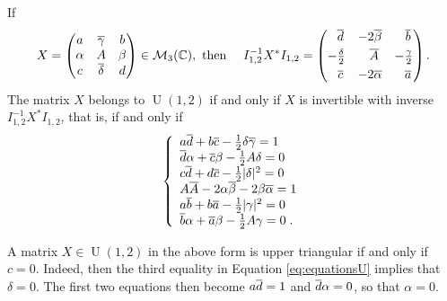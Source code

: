 \documentclass[11pt]{article}
\begin{document}
If
$$
X=\begin{pmatrix} a & \ov{\ga} & b\\
    \alpha & A & \beta \\ c & \ov{\delta} & d\end{pmatrix}\in\M_3(\CC),
\textrm{ then }\quad
I_{1,2}^{-1}X^*I_{1,2}=\begin{pmatrix} \ \ \ov{d} & -2\ov\beta & 
\ \ \ov{b} \vspace{.1cm}\\ 
-\frac{\delta}{2} & \ \ \ov{A} & -\frac{\ga}{2} \vspace{.1cm}\\ 
\ \ \ov{c} & -2\ov{\alpha} & \ \ \ov{a}\end{pmatrix}.
$$
The matrix $X$ belongs to $\operatorname{U}(1,2)$ if and only if $X$ is
invertible with inverse $I_{1,2}^{-1}X^*I_{1,2}$, that is, if and only if
\begin{equation}\label{eq:equationsU}
\left\{\begin{array}{l}
a{\overline{d}}+b\overline{c}-\frac{1}{2}\delta{\overline{\gamma}} =1\\
{\overline{d}}\alpha+\overline{c}\beta-\frac{1}{2}A\delta =0\\
c{\overline{d}}+d{\overline{c}}-\frac{1}{2}|\delta|^2 = 0 \\ 
A {\overline{A}}-2\alpha{\overline{\beta}}- 2\beta{\overline{\alpha}} =1 \\
a{\overline{b}}+b\overline{a}-\frac{1}{2}|\gamma|^2 = 0 \\ 
{\overline{b}}\alpha+{\overline{a}}\beta-\frac{1}{2}A\gamma =0 \;.
\end{array}\right.
\end{equation}

\brema\label{rem:cnultriangsup} A matrix $X\in \operatorname{U}(1,2)$
in the above form is upper triangular if and only if $c=0$. Indeed,
then the third equality in Equation \eqref{eq:equationsU} implies that
$\delta=0$. The first two equations then become $a{\overline{d}}=1$ and
${\overline{d}}\alpha=0$, so that $\alpha =0$.  \erema
\end{document}
